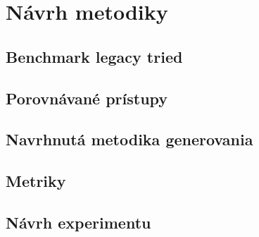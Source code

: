 \section{Návrh metodiky}\label{sec:metodika}

\subsection{Benchmark legacy tried}\label{sec:benchmark}

\subsection{Porovnávané prístupy}\label{sec:pristupy}

\subsection{Navrhnutá metodika generovania}\label{sec:metodika-m}

\subsection{Metriky}\label{sec:metriky}

\subsection{Návrh experimentu}\label{sec:experiment}


